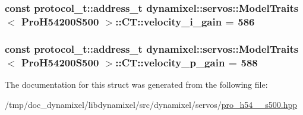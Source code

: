 \subsubsection[{\texorpdfstring{velocity\+\_\+i\+\_\+gain}{velocity_i_gain}}]{\setlength{\rightskip}{0pt plus 5cm}const {\bf protocol\+\_\+t\+::address\+\_\+t} {\bf dynamixel\+::servos\+::\+Model\+Traits}$<$ {\bf Pro\+H54200\+S500} $>$\+::C\+T\+::velocity\+\_\+i\+\_\+gain = 586\hspace{0.3cm}{\ttfamily [static]}}\hypertarget{structdynamixel_1_1servos_1_1_model_traits_3_01_pro_h54200_s500_01_4_1_1_c_t_adfb12b9744b9bb6fc65a210d1be39cb3}{}\label{structdynamixel_1_1servos_1_1_model_traits_3_01_pro_h54200_s500_01_4_1_1_c_t_adfb12b9744b9bb6fc65a210d1be39cb3}
\subsubsection[{\texorpdfstring{velocity\+\_\+p\+\_\+gain}{velocity_p_gain}}]{\setlength{\rightskip}{0pt plus 5cm}const {\bf protocol\+\_\+t\+::address\+\_\+t} {\bf dynamixel\+::servos\+::\+Model\+Traits}$<$ {\bf Pro\+H54200\+S500} $>$\+::C\+T\+::velocity\+\_\+p\+\_\+gain = 588\hspace{0.3cm}{\ttfamily [static]}}\hypertarget{structdynamixel_1_1servos_1_1_model_traits_3_01_pro_h54200_s500_01_4_1_1_c_t_ad163da4ef43e286d9d4af9fd4a4ccf71}{}\label{structdynamixel_1_1servos_1_1_model_traits_3_01_pro_h54200_s500_01_4_1_1_c_t_ad163da4ef43e286d9d4af9fd4a4ccf71}


The documentation for this struct was generated from the following file\+:\begin{DoxyCompactItemize}
\item 
/tmp/doc\+\_\+dynamixel/libdynamixel/src/dynamixel/servos/\hyperlink{pro__h54__200__s500_8hpp}{pro\+\_\+h54\+\_\+\_\+s500.\+hpp}\end{DoxyCompactItemize}
